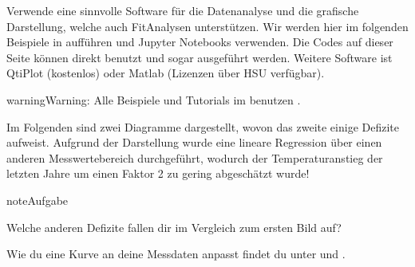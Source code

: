 \documentclass[letterpaper,10pt,english]{jupyterBook}
\begin{document}
\sphinxAtStartPar
Verwende eine sinnvolle Software für die Datenanalyse und die grafische Darstellung, welche auch Fit\sphinxhyphen{}Analysen unterstützen. Wir werden hier im folgenden Beispiele in  aufführen und Jupyter Notebooks verwenden. Die Codes auf dieser Seite können direkt benutzt und sogar ausgeführt werden.
Weitere Software ist Qti\sphinxhyphen{}Plot (kostenlos) oder Matlab (Lizenzen über HSU verfügbar).

\begin{sphinxadmonition}{warning}{Warning:}
\sphinxAtStartPar
Alle Beispiele und Tutorials im  benutzen .
\end{sphinxadmonition}

\sphinxAtStartPar
Im Folgenden sind zwei Diagramme dargestellt, wovon das zweite einige Defizite aufweist. Aufgrund der Darstellung wurde eine lineare Regression über einen anderen Messwertebereich durchgeführt, wodurch der Temperaturanstieg der letzten Jahre um einen Faktor 2 zu gering abgeschätzt wurde!

\begin{sphinxadmonition}{note}{Aufgabe}

\sphinxAtStartPar
Welche anderen Defizite fallen dir im Vergleich zum ersten Bild auf?
\end{sphinxadmonition}


\nopagebreak


\sphinxAtStartPar
Wie du eine Kurve an deine Messdaten anpasst findet du unter {\hyperref[\detokenize{content/1_Kurvenanpassung::doc}]{}} und {\hyperref[\detokenize{content/1_Tutorials::doc}]{}}.
\end{document}
